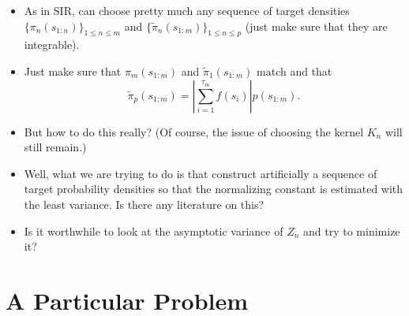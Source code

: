 \documentclass{article}
\begin{document}
\begin{itemize}

\item As in SIR, can choose pretty much any sequence of target densities $ \{ \pi_{n}(s_{1:n}) \}_{1 \leq n \leq m}$ and $ \{ \tilde{\pi}_{n}(s_{1:m}) \}_{1 \leq n \leq p} $ (just make sure that they are integrable).

\item Just make sure that $ \pi_{m}(s_{1:m})$ and $\tilde{\pi}_{1}(s_{1:m})$ match and that 
$$ \tilde{\pi}_{p}(s_{1:m}) = \left | \sum_{i=1}^{\tau_{m}} f(s_{i}) \right | p(s_{1:m}). $$

\item But how to do this really? (Of course, the issue of choosing the kernel $K_{n}$ will still remain.)

\item Well, what we are trying to do is that construct artificially a sequence of target probability densities so that the normalizing constant is estimated with the least variance. Is there any literature on this? 

\item Is it worthwhile to look at the asymptotic variance of $Z_{n}$ and try to minimize it?  
 
\end{itemize}

\section{A Particular Problem}
\end{document}
